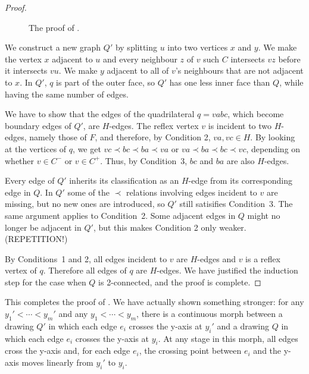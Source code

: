 \documentclass{patmorin}
\begin{document}
\begin{proof}
  \begin{figure}
     \caption{The proof of .}
  \end{figure}
   
   We construct a new graph $Q'$ by splitting $u$ into two vertices $x$
   and $y$.  We make the vertex $x$ adjacent to $u$ and every neighbour
   $z$ of $v$ such $C$ intersects $vz$ before it intersects $vu$.  We make
   $y$ adjacent to all of $v$'s neighbours that are not adjacent to $x$.
   In $Q'$, $q$ is part of the outer face, so $Q'$ has one less inner
   face than $Q$, while having the same number of edges.

We have to show that the edges of the quadrilateral 
$q=vabc$,
which become boundary edges of $Q'$, are $H$-edges.
The reflex vertex $v$ is incident to two $H$-edges, namely those of
$F$, and therefore, by Condition 2, $va,vc\in H$.
By looking at the vertices of $q$, we get
$vc \prec bc\prec ba\prec va$ or 
$va \prec ba\prec bc\prec vc$,
 depending on whether $v\in C^-$ or
$v\in C^+$. 
Thus, by Condition~3, $bc$ and $ba$ are also $H$-edges.

Every edge of $Q'$ inherits its classification as an $H$-edge from
its corresponding edge in $Q$.
   In $Q'$ some of the $\prec$ relations involving edges incident
   to $v$ are missing, but no new ones are introduced, so $Q'$ still
   satisifies Condition~3.
The same argument applies to
Condition~2. Some adjacent edges in $Q$ might no longer be adjacent
in $Q'$, but this makes Condition 2 only weaker. (REPETITION!)


   By Conditions~1 and 2, all edges incident to $v$ are $H$-edges and $v$
   is a reflex vertex of $q$. Therefore all edges of $q$ are $H$-edges.
We have justified the induction step for the case when $Q$ is
2-connected, and
   the proof is complete.
\end{proof}

This completes the proof of .  We have
actually shown something stronger: for any $y_1'<\cdots<y_m'$ and
any $y_1<\cdots<y_m$, there is a continuous morph
between a drawing $Q'$ in which each edge $e_i$ crosses the y-axis at
$y_i'$ and a drawing $Q$ in which each edge $e_i$ crosses the y-axis
at $y_i$.  At any stage in this morph, all edges cross the y-axis and,
for each edge $e_i$, the crossing point between $e_i$ and the y-axis
moves linearly from $y_i'$ to $y_i$.
\end{document}
